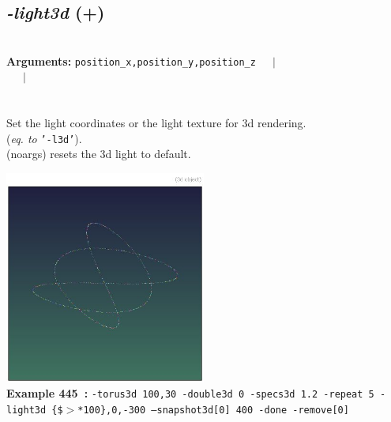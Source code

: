 \documentclass[a4paper,11pt,twoside]{book}
\begin{document}
\subsection{\emph{-light3d} (+)}\vspace*{-0.5em}
~\\\textbf{Arguments: } 
{\small \texttt{position\_x,position\_y,position\_z}}~~~$|$\\
\hspace*{2.2cm}{\small \texttt{[texture]}}~~~$|$\\
\\~\\
Set the light coordinates or the light texture for 3d rendering.
~\\(\emph{eq. to} {\small \texttt{'-l3d'}}).
~\\(noargs) resets the 3d light to default.
\begin{center}\includegraphics[keepaspectratio=true,height=7cm,width=\textwidth]{img/gmic_def445.jpg}\\
{\footnotesize \textbf{Example 445~:} \texttt{-torus3d 100,30 -double3d 0 -specs3d 1.2 -repeat 5 -light3d \{\$$>$*100\},0,-300 --snapshot3d[0] 400 -done -remove[0]}}
\end{center}
\end{document}
